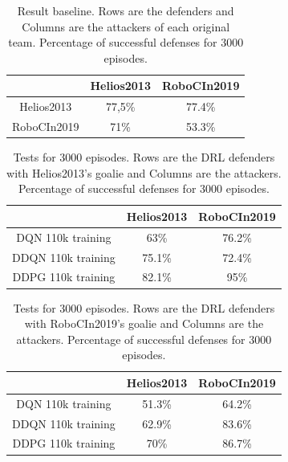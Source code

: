 \begin{table}[H]
\begin{center}
\begin{tabular}{|c|c|c|}
\hline

                   & Helios2013 & RoboCIn2019 \\ \hline
Helios2013         & 77,5\%     & 77.4\%      \\ \hline
RoboCIn2019        & 71\%       & 53.3\%      \\ \hline
    \end{tabular}
\end{center}
\caption{Result baseline. Rows are the defenders and Columns are the attackers of each original team. Percentage of successful defenses for 3000 episodes.}
\label{tab:result_base_line}
\end{table}

\begin{table}[H]
\begin{center}
\begin{tabular}{|c|c|c|}
\hline
                   & Helios2013 & RoboCIn2019 \\ \hline
DQN 110k training  & 63\%     & 76.2\%        \\ \hline
DDQN 110k training & 75.1\%       & 72.4\%      \\ \hline
DDPG 110k training & 82.1\%     & 95\%      \\ \hline
\end{tabular}
\end{center}
\caption{Tests for 3000 episodes. Rows are the DRL defenders with Helios2013's goalie and Columns are the attackers. Percentage of successful defenses for 3000 episodes.}
\label{tab:helios_result}
\end{table}


\begin{table}[H]
\begin{center}
\begin{tabular}{|c|c|c|}
\hline
                   & Helios2013 & RoboCIn2019 \\ \hline
DQN 110k training  & 51.3\%     & 64.2\%        \\ \hline
DDQN 110k training & 62.9\%     & 83.6\%      \\ \hline
DDPG 110k training & 70\%     & 86.7\%      \\ \hline
\end{tabular}
\end{center}
\caption{Tests for 3000 episodes. Rows are the DRL defenders with RoboCIn2019's goalie and Columns are the attackers. Percentage of successful defenses for 3000 episodes.}
\label{tab:rc_result}
\end{table}